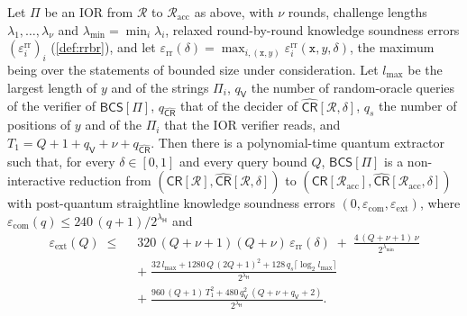 \begin{theorem}\label{thm:cdhz}
Let $\Pi$ be an IOR from $\mathcal{R}$ to $\mathcal{R}_{\mathrm{acc}}$ as above, with $\nu$ rounds, challenge lengths $\lambda_1,\dots,\lambda_\nu$ and $\lambda_{\min} = \min_i \lambda_i$, relaxed round-by-round knowledge soundness errors $(\varepsilon^{\mathrm{rr}}_i)_i$ (\cref{def:rrbr}), and let $\varepsilon_{\mathrm{rr}}(\delta) = \max_{i, (\mathtt{x}, y)} \varepsilon^{\mathrm{rr}}_i(\mathtt{x}, y, \delta)$, the maximum being over the statements of bounded size under consideration.
Let $l_{\max}$ be the largest length of $y$ and of the strings $\Pi_i$, $q_{\mathsf{V}}$ the number of random-oracle queries of the verifier of $\mathsf{BCS}[\Pi]$, $q_{\widehat{\mathsf{CR}}}$ that of the decider of $\widehat{\mathsf{CR}}[\mathcal{R},\delta]$, $q_s$ the number of positions of $y$ and of the $\Pi_i$ that the IOR verifier reads, and $T_1 = Q + 1 + q_{\mathsf{V}} + \nu + q_{\widehat{\mathsf{CR}}}$.
Then there is a polynomial-time quantum extractor such that, for every $\delta \in [0,1]$ and every query bound $Q$, $\mathsf{BCS}[\Pi]$ is a non-interactive reduction from $(\mathsf{CR}[\mathcal{R}], \widehat{\mathsf{CR}}[\mathcal{R}, \delta])$ to $(\mathsf{CR}[\mathcal{R}_{\mathrm{acc}}], \widehat{\mathsf{CR}}[\mathcal{R}_{\mathrm{acc}}, \delta])$ with post-quantum straightline knowledge soundness errors $(0, \varepsilon_{\mathrm{com}}, \varepsilon_{\mathrm{ext}})$, where $\varepsilon_{\mathrm{com}}(q) \le 240\,(q+1)/2^{\lambda_{\mathsf{H}}}$ and
\begin{align*}
  \varepsilon_{\mathrm{ext}}(Q) \;\le\;\;& 320\,(Q+\nu+1)(Q+\nu)\,\varepsilon_{\mathrm{rr}}(\delta) \;+\; \frac{4\,(Q+\nu+1)\,\nu}{2^{\lambda_{\min}}} \\
  &+\; \frac{32\, l_{\max} + 1280\, Q\,(2Q+1)^2 + 128\, q_s \lceil \log_2 l_{\max} \rceil}{2^{\lambda_{\mathsf{H}}}} \\
  &+\; \frac{960\,(Q+1)\,T_1^2 + 480\, q_{\mathsf{V}}^2\,(Q + \nu + q_{\mathsf{V}} + 2)}{2^{\lambda_{\mathsf{H}}}}.
\end{align*}
\end{theorem}

